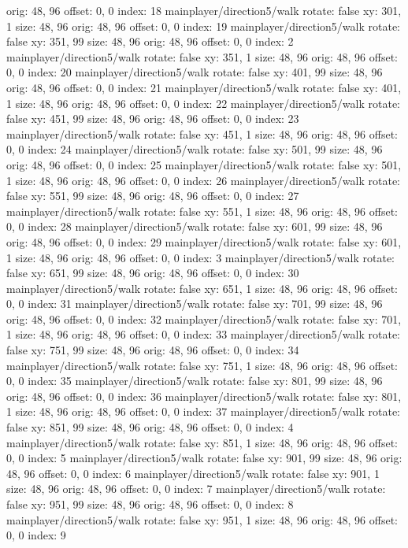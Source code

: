   orig: 48, 96
  offset: 0, 0
  index: 18
mainplayer/direction5/walk
  rotate: false
  xy: 301, 1
  size: 48, 96
  orig: 48, 96
  offset: 0, 0
  index: 19
mainplayer/direction5/walk
  rotate: false
  xy: 351, 99
  size: 48, 96
  orig: 48, 96
  offset: 0, 0
  index: 2
mainplayer/direction5/walk
  rotate: false
  xy: 351, 1
  size: 48, 96
  orig: 48, 96
  offset: 0, 0
  index: 20
mainplayer/direction5/walk
  rotate: false
  xy: 401, 99
  size: 48, 96
  orig: 48, 96
  offset: 0, 0
  index: 21
mainplayer/direction5/walk
  rotate: false
  xy: 401, 1
  size: 48, 96
  orig: 48, 96
  offset: 0, 0
  index: 22
mainplayer/direction5/walk
  rotate: false
  xy: 451, 99
  size: 48, 96
  orig: 48, 96
  offset: 0, 0
  index: 23
mainplayer/direction5/walk
  rotate: false
  xy: 451, 1
  size: 48, 96
  orig: 48, 96
  offset: 0, 0
  index: 24
mainplayer/direction5/walk
  rotate: false
  xy: 501, 99
  size: 48, 96
  orig: 48, 96
  offset: 0, 0
  index: 25
mainplayer/direction5/walk
  rotate: false
  xy: 501, 1
  size: 48, 96
  orig: 48, 96
  offset: 0, 0
  index: 26
mainplayer/direction5/walk
  rotate: false
  xy: 551, 99
  size: 48, 96
  orig: 48, 96
  offset: 0, 0
  index: 27
mainplayer/direction5/walk
  rotate: false
  xy: 551, 1
  size: 48, 96
  orig: 48, 96
  offset: 0, 0
  index: 28
mainplayer/direction5/walk
  rotate: false
  xy: 601, 99
  size: 48, 96
  orig: 48, 96
  offset: 0, 0
  index: 29
mainplayer/direction5/walk
  rotate: false
  xy: 601, 1
  size: 48, 96
  orig: 48, 96
  offset: 0, 0
  index: 3
mainplayer/direction5/walk
  rotate: false
  xy: 651, 99
  size: 48, 96
  orig: 48, 96
  offset: 0, 0
  index: 30
mainplayer/direction5/walk
  rotate: false
  xy: 651, 1
  size: 48, 96
  orig: 48, 96
  offset: 0, 0
  index: 31
mainplayer/direction5/walk
  rotate: false
  xy: 701, 99
  size: 48, 96
  orig: 48, 96
  offset: 0, 0
  index: 32
mainplayer/direction5/walk
  rotate: false
  xy: 701, 1
  size: 48, 96
  orig: 48, 96
  offset: 0, 0
  index: 33
mainplayer/direction5/walk
  rotate: false
  xy: 751, 99
  size: 48, 96
  orig: 48, 96
  offset: 0, 0
  index: 34
mainplayer/direction5/walk
  rotate: false
  xy: 751, 1
  size: 48, 96
  orig: 48, 96
  offset: 0, 0
  index: 35
mainplayer/direction5/walk
  rotate: false
  xy: 801, 99
  size: 48, 96
  orig: 48, 96
  offset: 0, 0
  index: 36
mainplayer/direction5/walk
  rotate: false
  xy: 801, 1
  size: 48, 96
  orig: 48, 96
  offset: 0, 0
  index: 37
mainplayer/direction5/walk
  rotate: false
  xy: 851, 99
  size: 48, 96
  orig: 48, 96
  offset: 0, 0
  index: 4
mainplayer/direction5/walk
  rotate: false
  xy: 851, 1
  size: 48, 96
  orig: 48, 96
  offset: 0, 0
  index: 5
mainplayer/direction5/walk
  rotate: false
  xy: 901, 99
  size: 48, 96
  orig: 48, 96
  offset: 0, 0
  index: 6
mainplayer/direction5/walk
  rotate: false
  xy: 901, 1
  size: 48, 96
  orig: 48, 96
  offset: 0, 0
  index: 7
mainplayer/direction5/walk
  rotate: false
  xy: 951, 99
  size: 48, 96
  orig: 48, 96
  offset: 0, 0
  index: 8
mainplayer/direction5/walk
  rotate: false
  xy: 951, 1
  size: 48, 96
  orig: 48, 96
  offset: 0, 0
  index: 9


